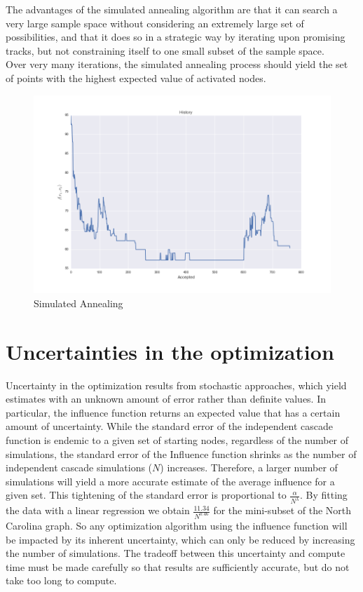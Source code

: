 \documentclass[11pt]{scrartcl} %
\begin{document}
The advantages of the simulated annealing algorithm are that it can search a very large sample space without considering an extremely large set of possibilities, and that it does so in a strategic way by iterating upon promising tracks, but not constraining itself to one small subset of the sample space.  \\

Over very many iterations, the simulated annealing process should yield the set of points with the highest expected value of activated nodes. \\

\begin{figure}[h!]
\centering
\includegraphics[width=10 cm]{SimAn}
\caption{Simulated Annealing}
\label{fig:SA}
\end{figure}

\section{Uncertainties in the optimization}

Uncertainty in the optimization results from stochastic approaches, which yield estimates with an unknown amount of error rather than definite values.  In particular, the influence function returns an expected value that has a certain amount of uncertainty.  While the standard error of the independent cascade function is endemic to a given set of starting nodes, regardless of the number of simulations, the standard error of the Influence function shrinks as the number of independent cascade simulations ($N$) increases.  Therefore, a larger number of simulations will yield a more accurate estimate of the average influence for a given set.  This tightening of the standard error is proportional to $\frac{\alpha}{N^{\lambda}}$. By fitting the data with a linear regression we obtain  $\frac{11.34}{N^{0.46}}$ for the mini-subset of the North Carolina graph.  So any optimization algorithm using the influence function will be impacted by its inherent uncertainty, which can only be reduced by increasing the number of simulations.  The tradeoff between this uncertainty and compute time must be made carefully so that results are sufficiently accurate, but do not take too long to compute.  \\
	
\end{document}
